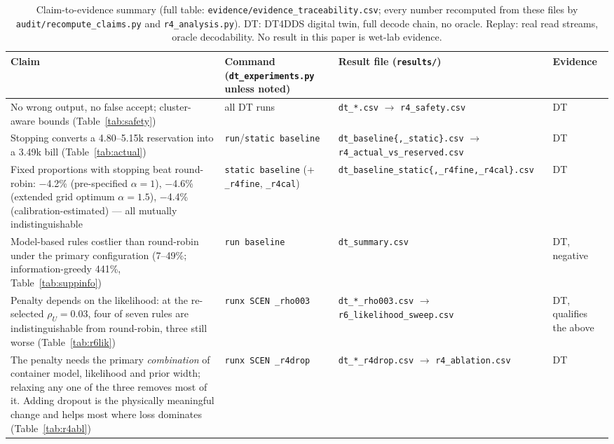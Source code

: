 \begin{table}[!t]
\centering
\caption{Claim-to-evidence summary (full table: \texttt{evidence/evidence\_traceability.csv}; every number
recomputed from these files by \texttt{audit/recompute\_claims.py} and \texttt{r4\_analysis.py}).  DT: DT4DDS
digital twin, full decode chain, no oracle.  Replay: real read streams, oracle decodability.  No result in this
paper is wet-lab evidence.}
\label{tab:evidence}
\scriptsize
\setlength{\tabcolsep}{3pt}
\begin{tabular}{@{}p{66mm}p{42mm}p{46mm}p{22mm}@{}}
\toprule
Claim & Command (\texttt{dt\_experiments.py} unless noted) & Result file (\texttt{results/}) & Evidence \\
\midrule
No wrong output, no false accept; cluster-aware bounds (Table~\ref{tab:safety}) & all DT runs & \texttt{dt\_*.csv} $\to$ \texttt{r4\_safety.csv} & DT \\
Stopping converts a 4.80--5.15k reservation into a 3.49k bill (Table~\ref{tab:actual}) & \texttt{run}/\texttt{static baseline} & \texttt{dt\_baseline\{,\_static\}.csv} $\to$ \texttt{r4\_actual\_vs\_reserved.csv} & DT \\
Fixed proportions with stopping beat round-robin: $-$4.2\% (pre-specified $\alpha{=}1$), $-$4.6\% (extended grid optimum $\alpha{=}1.5$), $-$4.4\% (calibration-estimated) --- all mutually indistinguishable & \texttt{static baseline} (+\,\texttt{\_r4fine}, \texttt{\_r4cal}) & \texttt{dt\_baseline\_static}\allowbreak\texttt{\{,\_r4fine,\_r4cal\}.csv} & DT \\
Model-based rules costlier than round-robin under the primary configuration (7--49\%; information-greedy 441\%, Table~\ref{tab:suppinfo}) & \texttt{run baseline} & \texttt{dt\_summary.csv} & DT, negative \\
Penalty depends on the likelihood: at the re-selected $\rho_U{=}0.03$, four of seven rules are indistinguishable from round-robin, three still worse (Table~\ref{tab:r6lik}) & \texttt{runx SCEN \_rho003} & \texttt{dt\_*\_rho003.csv} $\to$\allowbreak{} \texttt{r6\_likelihood\_sweep.csv} & DT, qualifies the above \\
The penalty needs the primary \emph{combination} of container model, likelihood and prior width; relaxing any one of the three removes most of it.  Adding dropout is the physically meaningful change and helps most where loss dominates (Table~\ref{tab:r4abl}) & \texttt{runx SCEN \_r4drop} & \texttt{dt\_*\_r4drop.csv} $\to$\allowbreak{} \texttt{r4\_ablation.csv} & DT \\

\end{tabular}
\end{table}
